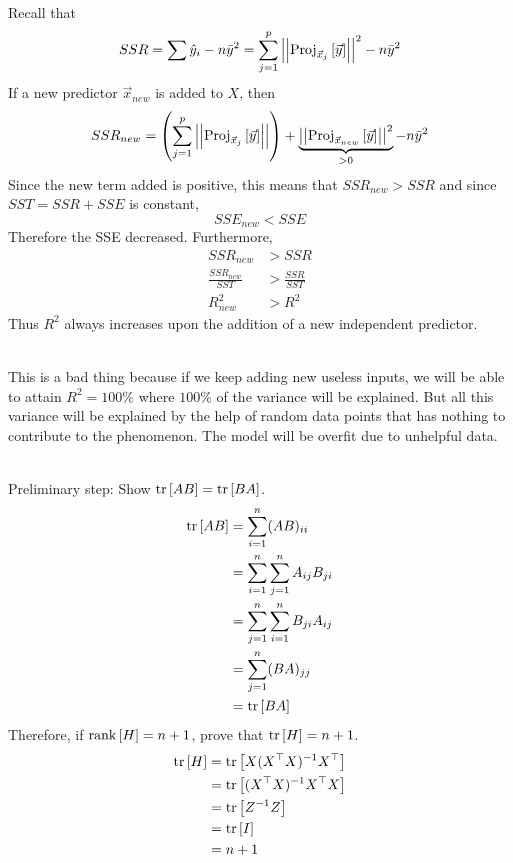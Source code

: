 \documentclass[12pt]{article}
\begin{document}
\begin{enumerate}
 \\
Recall that $$SSR = \sum \hat{y}_i - n\bar{y}^2 = \sum_{j=1}^p \left|\left|\text{Proj}_{\vec{x}_j}\left[\vec{y}\right]\right|\right|^2 - n\bar{y}^2 $$ If a new predictor $\vec{x}_{new}$ is added to $X$, then 
$$SSR_{new} = \left(\sum_{j=1}^p \left|\left|\text{Proj}_{\vec{x}_j}\left[\vec{y}\right]\right|\right|\right) + \underbrace{\left|\left|\text{Proj}_{\vec{x}_{new}}\left[\vec{y}\right]\right|\right|^2}_{> 0} - n\bar{y}^2 $$ 
Since the new term added is positive, this means that $SSR_{new} > SSR$ and since $SST = SSR + SSE$ is constant, $$SSE_{new} < SSE$$ Therefore the SSE decreased. Furthermore, $$ \begin{aligned} 
SSR_{new} &> SSR \\ \frac{SSR_{new}}{SST} &> \frac{SSR}{SST} \\ R^2_{new} &> R^2 \end{aligned} $$ Thus $R^2$ always increases upon the addition of a new independent predictor. 

 \\
This is a bad thing because if we keep adding new useless inputs, we will be able to attain $R^2 = 100\%$ where $100\%$ of the variance will be explained. But all this variance will be explained by the help of random data points that has nothing to contribute to the phenomenon. The model will be overfit due to unhelpful data. 


 \\
Preliminary step: Show $\text{tr}\left[AB\right] = \text{tr}\left[BA\right]$. 
$$ \begin{aligned} \text{tr}\left[AB\right] &= \sum_{i=1}^n (AB)_{ii} \\ &= \sum_{i=1}^n\sum_{j=1}^n A_{ij}B_{ji} \\ &= \sum_{j=1}^n \sum_{i=1}^n B_{ji}A_{ij} \\ &= \sum_{j=1}^n (BA)_{jj} \\ &= \text{tr}\left[BA\right] \end{aligned} $$ 
Therefore, if $\text{rank}\left[H\right] = n+1$, prove that $\text{tr}\left[H\right] = n+1$. 
$$ \begin{aligned} \text{tr}\left[H\right] &= \text{tr}\left[X(X^\top X)^{-1} X^\top\right] \\ &= \text{tr}\left[(X^\top X)^{-1}X^\top X\right] \\ &= \text{tr}\left[Z^{-1}Z\right] \\ &= \text{tr}\left[I\right] \\ &= n+1 \end{aligned} $$ 

\end{enumerate}
\end{document}
